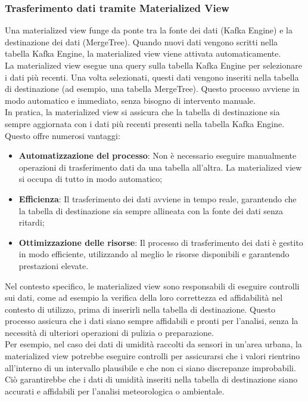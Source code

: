 \subsubsection{Trasferimento dati tramite Materialized View}
Una materialized view funge da ponte tra la fonte dei dati (Kafka Engine) e la destinazione dei dati (MergeTree). Quando nuovi dati vengono scritti nella tabella Kafka Engine, la materialized view viene attivata automaticamente.\\
La materialized view esegue una query sulla tabella Kafka Engine per selezionare i dati più recenti. Una volta selezionati, questi dati vengono inseriti nella tabella di destinazione (ad esempio, una tabella MergeTree). Questo processo avviene in modo automatico e immediato, senza bisogno di intervento manuale.\\
In pratica, la materialized view si assicura che la tabella di destinazione sia sempre aggiornata con i dati più recenti presenti nella tabella Kafka Engine. Questo offre numerosi vantaggi:
\begin{itemize}
  \item \textbf{Automatizzazione del processo}: Non è necessario eseguire manualmente operazioni di trasferimento dati da una tabella all'altra. La materialized view si occupa di tutto in modo automatico;
  \item \textbf{Efficienza}: Il trasferimento dei dati avviene in tempo reale, garantendo che la tabella di destinazione sia sempre allineata con la fonte dei dati senza ritardi;
  \item \textbf{Ottimizzazione delle risorse}: Il processo di trasferimento dei dati è gestito in modo efficiente, utilizzando al meglio le risorse disponibili e garantendo prestazioni elevate.
\end{itemize}
Nel contesto specifico, le materialized view sono responsabili di eseguire controlli sui dati, come ad esempio la verifica della loro correttezza ed affidabilità nel contesto di utilizzo, prima di inserirli nella tabella di destinazione. Questo processo assicura che i dati siano sempre affidabili e pronti per l'analisi, senza la necessità di ulteriori operazioni di pulizia o preparazione.\\
Per esempio, nel caso dei dati di umidità raccolti da sensori in un'area urbana, la materialized view potrebbe eseguire controlli per assicurarsi che i valori rientrino all'interno di un intervallo plausibile e che non ci siano discrepanze improbabili. Ciò garantirebbe che i dati di umidità inseriti nella tabella di destinazione siano accurati e affidabili per l'analisi meteorologica o ambientale.


